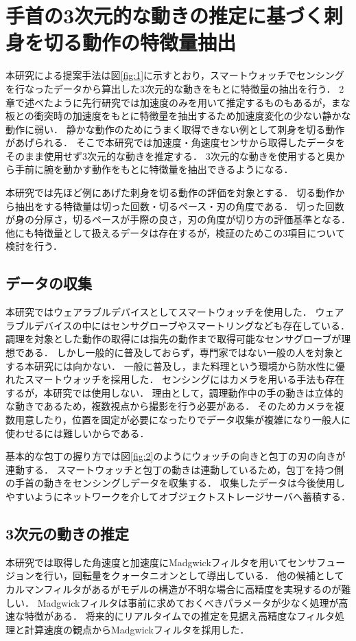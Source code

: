 \chapter{手首の3次元的な動きの推定に基づく刺身を切る動作の特徴量抽出}
本研究による提案手法は図\ref{fig:1}に示すとおり，スマートウォッチでセンシングを行なったデータから算出した3次元的な動きをもとに特徴量の抽出を行う．
2章で述べたように先行研究\cite{kumazawaanalysis}では加速度のみを用いて推定するものもあるが，まな板との衝突時の加速度をもとに特徴量を抽出するため加速度変化の少ない静かな動作に弱い．
静かな動作のためにうまく取得できない例として刺身を切る動作があげられる．
そこで本研究では加速度・角速度センサから取得したデータをそのまま使用せず3次元的な動きを推定する．
3次元的な動きを使用すると奥から手前に腕を動かす動作をもとに特徴量を抽出できるようになる．

本研究では先ほど例にあげた刺身を切る動作の評価を対象とする．
切る動作から抽出をする特徴量は切った回数・切るペース・刃の角度である．
切った回数が身の分厚さ，切るペースが手際の良さ，刃の角度が切り方の評価基準となる．
他にも特徴量として扱えるデータは存在するが，検証のためこの3項目について検討を行う．

\section{データの収集}
本研究ではウェアラブルデバイスとしてスマートウォッチを使用した．
ウェアラブルデバイスの中にはセンサグローブやスマートリングなども存在している．
調理を対象とした動作の取得には指先の動作まで取得可能なセンサグローブが理想である．
しかし一般的に普及しておらず，専門家ではない一般の人を対象とする本研究には向かない．
一般に普及し，また料理という環境から防水性に優れたスマートウォッチを採用した．
センシングにはカメラを用いる手法も存在するが，本研究では使用しない．
理由として，調理動作中の手の動きは立体的な動きであるため，複数視点から撮影を行う必要がある．
そのためカメラを複数用意したり，位置を固定が必要になったりでデータ収集が複雑になり一般人に使わせるには難しいからである．

基本的な包丁の握り方では図\ref{fig:2}のようにウォッチの向きと包丁の刃の向きが連動する．
スマートウォッチと包丁の動きは連動しているため，包丁を持つ側の手首の動きをセンシングしデータを収集する．
収集したデータは今後使用しやすいようにネットワークを介してオブジェクトストレージサーバへ蓄積する．
\section{3次元の動きの推定}
本研究では取得した角速度と加速度にMadgwickフィルタを用いてセンサフュージョンを行い，回転量をクォータニオンとして導出している．
他の候補としてカルマンフィルタがあるがモデルの構造が不明な場合に高精度を実現するのが難しい．
Madgwickフィルタは事前に求めておくべきパラメータが少なく処理が高速な特徴がある．
将来的にリアルタイムでの推定を見据え高精度なフィルタ処理と計算速度の観点からMadgwickフィルタを採用した．

